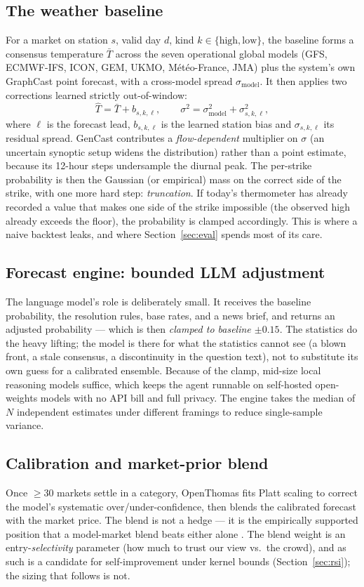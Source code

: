 \documentclass[10pt,twocolumn]{article}
\begin{document}
\subsection{The weather baseline}
For a market on station $s$, valid day $d$, kind $k\in\{\text{high},\text{low}\}$,
the baseline forms a consensus temperature $\bar{T}$ across the seven operational
global models (GFS, ECMWF-IFS, ICON, GEM, UKMO, M\'et\'eo-France, JMA) plus the
system's own GraphCast point forecast, with a cross-model spread $\sigma_{\text{model}}$.
It then applies two corrections learned strictly out-of-window:
\[
\hat{T} = \bar{T} + b_{s,k,\ell}, \qquad
\sigma^2 = \sigma_{\text{model}}^2 + \sigma_{s,k,\ell}^2 ,
\]
where $\ell$ is the forecast lead, $b_{s,k,\ell}$ is the learned station bias and
$\sigma_{s,k,\ell}$ its residual spread. GenCast contributes a
\emph{flow-dependent} multiplier on $\sigma$ (an uncertain synoptic setup widens
the distribution) rather than a point estimate, because its 12-hour steps
undersample the diurnal peak. The per-strike probability is then the Gaussian (or
empirical) mass on the correct side of the strike, with one more hard step:
\emph{truncation}. If today's thermometer has already recorded a value that makes
one side of the strike impossible (the observed high already exceeds the floor),
the probability is clamped accordingly. This is where a naive backtest leaks, and
where Section~\ref{sec:eval} spends most of its care.

\subsection{Forecast engine: bounded LLM adjustment}
The language model's role is deliberately small. It receives the baseline
probability, the resolution rules, base rates, and a news brief, and returns an
adjusted probability --- which is then \emph{clamped to baseline $\pm 0.15$}. The
statistics do the heavy lifting; the model is there for what the statistics
cannot see (a blown front, a stale consensus, a discontinuity in the question
text), not to substitute its own guess for a calibrated ensemble. Because of the
clamp, mid-size local reasoning models suffice, which keeps the agent runnable on
self-hosted open-weights models with no API bill and full privacy. The engine
takes the median of $N$ independent estimates under different framings to reduce
single-sample variance.

\subsection{Calibration and market-prior blend}
Once $\geq 30$ markets settle in a category, OpenThomas fits Platt scaling to
correct the model's systematic over/under-confidence, then blends the calibrated
forecast with the market price. The blend is not a hedge --- it is the empirically
supported position that a model-market blend beats either alone \cite{blend}. The
blend weight is an entry-\emph{selectivity} parameter (how much to trust our view
vs.\ the crowd), and as such is a candidate for self-improvement under kernel
bounds (Section~\ref{sec:rsi}); the sizing that follows is not.
\end{document}
